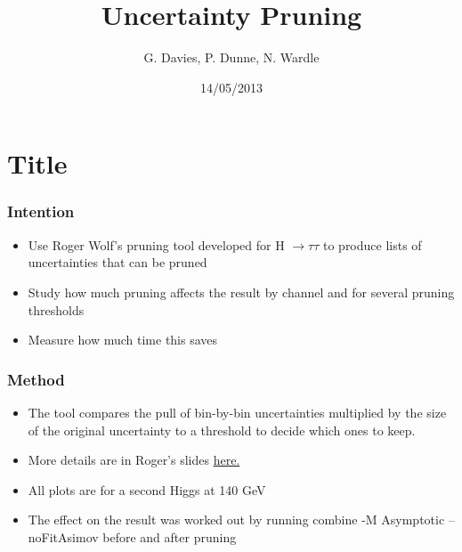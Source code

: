 \documentclass[hyperref=colorlinks]{beamer}
\title{Uncertainty Pruning}
\author[P. Dunne]{G. Davies, P. Dunne, N. Wardle}
\date{14/05/2013}
\begin{document}
\section{Title}
\begin{frame}
  \titlepage
\end{frame}

\begin{frame}
  \frametitle{Intention}
  \begin{itemize}
  \item Use Roger Wolf's pruning tool developed for H $\rightarrow \tau \tau$ to produce lists of uncertainties that can be pruned
  \item Study how much pruning affects the result by channel and for several pruning thresholds
  \item Measure how much time this saves
  \end{itemize}
\end{frame}

\begin{frame}
  \frametitle{Method}
  \begin{itemize}
  \item The tool compares the pull of bin-by-bin uncertainties multiplied by the size of the original uncertainty to a threshold to decide which ones to keep.
  \item More details are in Roger's slides  \href{https://indico.cern.ch/getFile.py/access?contribId=29&sessionId=5&resId=0&materialId=slides&confId=239842}{here.}
  \item All plots are for a second Higgs at 140 GeV
  \item The effect on the result was worked out by running combine -M Asymptotic --noFitAsimov before and after pruning
  \end{itemize}
\end{frame}
\end{document}
